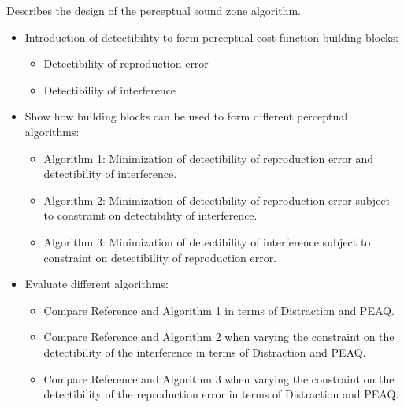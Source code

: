 Describes the design of the perceptual sound zone algorithm.
\begin{itemize}
    \item Introduction of detectibility to form perceptual cost function building blocks:
        \begin{itemize}
            \item Detectibility of reproduction error
            \item Detectibility of interference
        \end{itemize}
    \item Show how building blocks can be used to form different perceptual algorithms:
        \begin{itemize}
            \item Algorithm 1: Minimization of detectibility of reproduction error and detectibility of interference.
            \item Algorithm 2: Minimization of detectibility of reproduction error subject to constraint on detectibility of interference.
            \item Algorithm 3: Minimization of detectibility of interference subject to constraint on detectibility of reproduction error.
        \end{itemize}
    \item Evaluate different algorithms:
        \begin{itemize}
            \item Compare Reference and Algorithm 1 in terms of Distraction and PEAQ.
            \item Compare Reference and Algorithm 2 when varying the constraint on the detectibility of the interference in terms of Distraction and PEAQ.
            \item Compare Reference and Algorithm 3 when varying the constraint on the detectibility of the reproduction error in terms of Distraction and PEAQ.
        \end{itemize}
\end{itemize}
